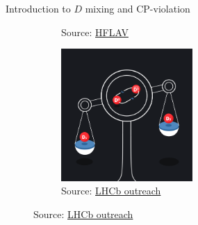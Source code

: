 \documentclass{beamer}
\begin{document}
\begin{frame}{Introduction to $D$ mixing and CP-violation}
\begin{figure}
\begin{subfigure}{0.4\textwidth}
      \caption{Source: \href{https://hflav-eos.web.cern.ch/hflav-eos/charm/CKM21/results_mix_cpv.html}{HFLAV}}
    \end{subfigure}%
    \begin{subfigure}{0.4\textwidth}
      \centering
      \includegraphics[width=0.55\textwidth]{Plots/D0OscArt.png}
      \caption{Source: \href{https://lhcb-outreach.web.cern.ch/2021/06/08/first-observation-of-the-mass-difference-between-neutral-charm-mesons/}{LHCb outreach}}
    \end{subfigure}
  \end{figure}
\end{frame}
\end{document}
